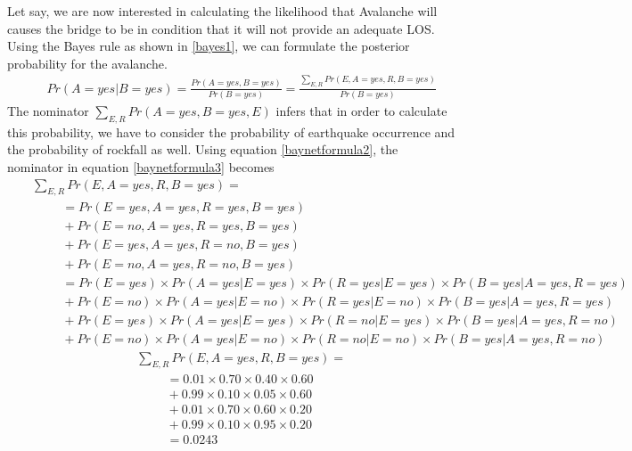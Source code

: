 Let say, we are now interested in calculating the likelihood that Avalanche will causes the bridge to be in condition that it will not provide an adequate LOS. Using the Bayes rule as shown in \eqref{bayes1}, we can formulate the posterior probability for the avalanche.
\begin{eqnarray}
 && Pr(A=yes|B=yes)= \frac{Pr(A=yes,B=yes)}{Pr(B=yes)} = \frac{\sum_{E,R}Pr(E,A=yes,R,B=yes)}{Pr(B=yes)} \label{baynetformula3}
\end{eqnarray}
The nominator $\sum_{E,R} Pr(A=yes,B=yes,E)$ infers that in order to calculate this probability, we have to consider the probability of earthquake occurrence and the probability of rockfall as well. Using equation \eqref{baynetformula2}, the nominator in equation \eqref{baynetformula3} becomes
\begin{eqnarray}
 && \sum_{E,R}Pr(E,A=yes,R,B=yes)= \nonumber \\ 
 && \hspace{1cm}= Pr(E=yes,A=yes,R=yes,B=yes)    \label{baynetformula4} \\
 && \hspace{1cm}+ Pr(E=no,A=yes,R=yes,B=yes)   \label{baynetformula5} \\
 && \hspace{1cm}+ Pr(E=yes,A=yes,R=no,B=yes)   \label{baynetformula6} \\
 && \hspace{1cm}+ Pr(E=no,A=yes,R=no,B=yes)   \label{baynetformula7} \\
 && \hspace{1cm}= Pr(E=yes)\times Pr(A=yes|E=yes)\times Pr(R=yes|E=yes)\times Pr(B=yes|A=yes,R=yes)   \label{baynetformula8} \\
 && \hspace{1cm}+ Pr(E=no)\times Pr(A=yes|E=no)\times Pr(R=yes|E=no)\times Pr(B=yes|A=yes,R=yes)   \label{baynetformula9} \\
 && \hspace{1cm}+ Pr(E=yes)\times Pr(A=yes|E=yes)\times Pr(R=no|E=yes)\times Pr(B=yes|A=yes,R=no)   \label{baynetformula10} \\
 && \hspace{1cm}+ Pr(E=no)\times Pr(A=yes|E=no)\times Pr(R=no|E=no)\times Pr(B=yes|A=yes,R=no)   \label{baynetformula11} 
\end{eqnarray}
%
\begin{eqnarray}
 && \sum_{E,R}Pr(E,A=yes,R,B=yes)= \nonumber \\ 
 && \hspace{1cm}= 0.01\times 0.70 \times 0.40 \times 0.60   \nonumber \\
 && \hspace{1cm}+ 0.99 \times 0.10 \times 0.05 \times 0.60   \nonumber \\
 && \hspace{1cm}+ 0.01 \times 0.70 \times 0.60 \times 0.20    \nonumber \\
 && \hspace{1cm}+ 0.99 \times 0.10 \times 0.95 \times 0.20   \nonumber \\
 && \hspace{1cm} = 0.0243 \nonumber 
\end{eqnarray}

